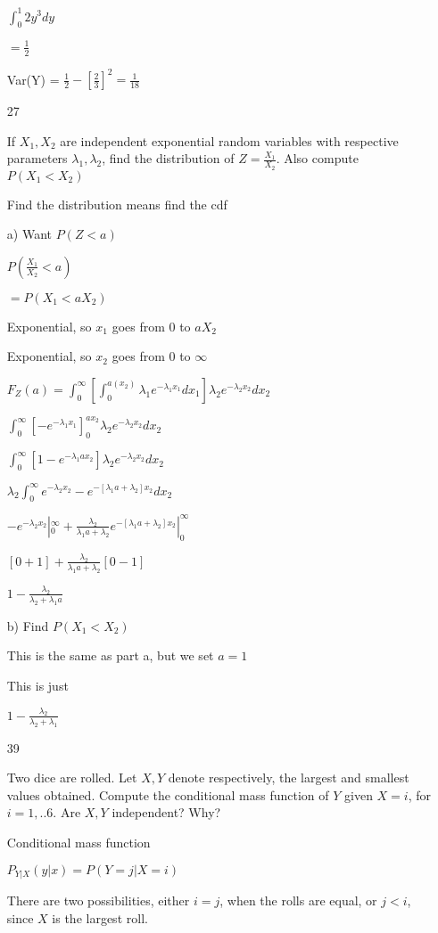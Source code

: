 \documentclass[11pt]{article}
\begin{document}
\begin{itemize}
$\int_0^1 2y^3 dy$

$=\frac{1}{2}$

Var(Y) = $\frac{1}{2} - [\frac{2}{3}]^2 = \frac{1}{18}$
\item[27]

If $X_1, X_2$ are independent exponential random variables with respective parameters $\lambda_1, \lambda_2$, find the distribution of $Z = \frac{X_1}{X_2}$. Also compute $P(X_1 < X_2)$

Find the distribution means find the cdf

a) Want $P(Z < a)$

$P(\frac{X_1}{X_2} < a)$

$=P(X_1 < aX_2)$

Exponential, so $x_1$ goes from 0 to $aX_2$

Exponential, so $x_2$ goes from 0 to $\infty$

$F_Z(a) = \int_{0}^{\infty} [\int_{0}^{a(x_2)} \lambda_1 e^{-\lambda_1 x_1}dx_1] \lambda_2 e^{-\lambda_2 x_2} dx_2$

$\int_{0}^{\infty} [-e^{-\lambda_1 x_1}]_0^{ax_2} \lambda_2 e^{-\lambda_2 x_2} dx_2$

$\int_{0}^{\infty} [1-e^{-\lambda_1 ax_2}] \lambda_2 e^{-\lambda_2 x_2} dx_2$

$\lambda_2 \int_{0}^{\infty} e^{-\lambda_2 x_2} - e^{-[\lambda_1 a+\lambda_2] x_2} dx_2$

$-e^{-\lambda_2 x_2}|_0^{\infty} + \frac{\lambda_2}{\lambda_1 a + \lambda_2} e^{-[\lambda_1 a + \lambda_2] x_2}|_0^{\infty}$

$[0 + 1] + \frac{\lambda_2}{\lambda_1 a + \lambda_2}[0 - 1]$

$1 - \frac{\lambda_2}{\lambda_2 + \lambda_1 a}$

b) Find $P(X_1 < X_2)$

This is the same as part a, but we set $a = 1$

This is just 

$1 - \frac{\lambda_2}{\lambda_2 + \lambda_1}$

\item[39]

Two dice are rolled. Let $X,Y$ denote respectively, the largest and smallest values obtained. Compute the conditional mass function of $Y$ given $X = i$, for $i =1,..6$. Are $X,Y$ independent? Why?

Conditional mass function

$P_{Y|X} (y|x) = P(Y = j | X = i)$

There are two possibilities, either $i = j$, when the rolls are equal, or $j < i$, since $X$ is the largest roll.


\end{itemize}
\end{document}
